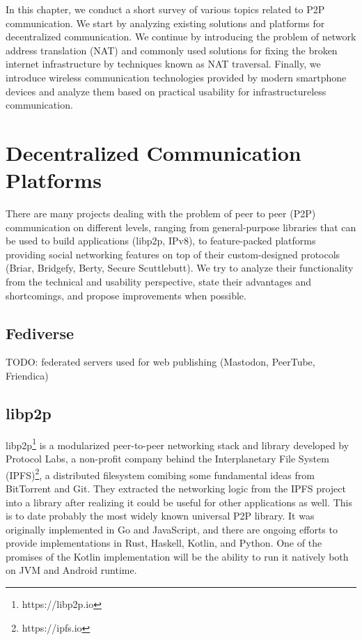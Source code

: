 In this chapter, we conduct a short survey of various topics related to P2P communication. We start by analyzing existing solutions and platforms for decentralized communication. We continue by introducing the problem of network address translation (NAT) and commonly used solutions for fixing the broken internet infrastructure by techniques known as NAT traversal. Finally, we introduce wireless communication technologies provided by modern smartphone devices and analyze them based on practical usability for infrastructureless communication.

\section{Decentralized Communication Platforms}

There are many projects dealing with the problem of peer to peer (P2P) communication on different levels, ranging from general-purpose libraries that can be used to build applications (libp2p, IPv8), to feature-packed platforms providing social networking features on top of their custom-designed protocols (Briar, Bridgefy, Berty, Secure Scuttlebutt). We try to analyze their functionality from the technical and usability perspective, state their advantages and shortcomings, and propose improvements when possible.

\subsection{Fediverse}
TODO: federated servers used for web publishing (Mastodon, PeerTube, Friendica)

\subsection{libp2p}


libp2p\footnote{https://libp2p.io} is a modularized peer-to-peer networking stack and library developed by Protocol Labs, a non-profit company behind the Interplanetary File System (IPFS)\footnote{https://ipfs.io}, a distributed filesystem comibing some fundamental ideas from BitTorrent and Git. They extracted the networking logic from the IPFS project into a library after realizing it could be useful for other applications as well. This is to date probably the most widely known universal P2P library. It was originally implemented in Go and JavaScript, and there are ongoing efforts to provide implementations in Rust, Haskell, Kotlin, and Python. One of the promises of the Kotlin implementation will be the ability to run it natively both on JVM and Android runtime.

